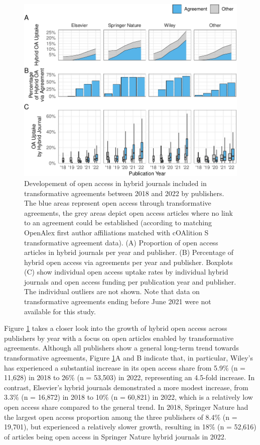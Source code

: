 \documentclass[a4paper,man,floatsintext,longtable,noextraspace,12pt]{apa6}
\begin{document}
\begin{figure}[ht!]

{\centering \includegraphics[width=0.99\linewidth,]{fig/publisher_figure-1} 

}

\caption{Developement of open access in hybrid journals included in transformative agreements between 2018 and 2022 by publishers. The blue areas represent open access through transformative agreements, the grey areas depict open access articles where no link to an agreement could be established (according to matching OpenAlex first author affiliations matched with cOAlition S transformative agreement data). (A) Proportion of open access articles in hybrid journals per year and publisher. (B) Percentage of hybrid open access via agreements per year and publisher. Boxplots (C) show individual open access uptake rates by individual hybrid journals and open access funding per publication year and publisher. The individual outliers are not shown. Note that data on transformative agreements ending before June 2021 were not available for this study.}\label{fig:publisher_figure}
\end{figure}

Figure \ref{fig:publisher_figure} takes a closer look into the growth of
hybrid open access across publishers by year with a focus on open
articles enabled by transformative agreements. Although all publishers
show a general long-term trend towards transformative agreements, Figure
\ref{fig:publisher_figure}A and B indicate that, in particular, Wiley's
has experienced a substantial increase in its open access share from
5.9\% (n = 11,628) in 2018 to 26\% (n = 53,503) in 2022, representing an
4.5-fold increase. In contrast, Elsevier's hybrid journals demonstrated
a more modest increase, from 3.3\% (n = 16,872) in 2018 to 10\% (n =
60,821) in 2022, which is a relatively low open access share compared to
the general trend. In 2018, Springer Nature had the largest open access
proportion among the three publishers of 8.4\% (n = 19,701), but
experienced a relatively slower growth, resulting in 18\% (n = 52,616)
of articles being open access in Springer Nature hybrid journals in
2022.
\end{document}

